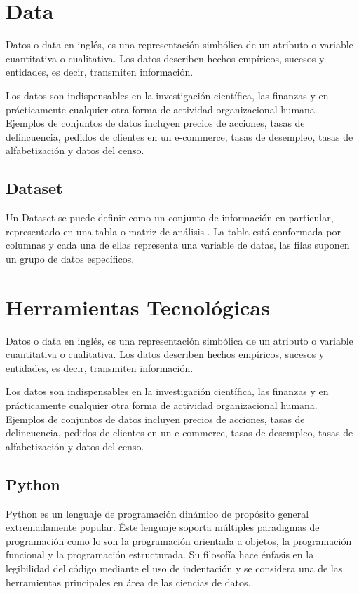 \section{Data}

Datos o data en inglés, es una representación simbólica de un atributo o variable cuantitativa o cualitativa. Los datos describen hechos empíricos, sucesos y entidades, es decir, transmiten información. 

Los datos son indispensables en la investigación científica, las finanzas y en prácticamente cualquier otra forma de actividad organizacional humana. Ejemplos de conjuntos de datos incluyen precios de acciones, tasas de delincuencia, pedidos de clientes en un e-commerce, tasas de desempleo, tasas de alfabetización y datos del censo.
	
\subsection{Dataset}

Un Dataset se puede definir como un conjunto de información en particular, representado en una tabla o matriz de análisis \cite{gold2020}. La tabla está conformada por columnas y cada una de ellas representa una variable de datas, las filas suponen un grupo de datos específicos.

\section{Herramientas Tecnológicas}

Datos o data en inglés, es una representación simbólica de un atributo o variable cuantitativa o cualitativa. Los datos describen hechos empíricos, sucesos y entidades, es decir, transmiten información. 

Los datos son indispensables en la investigación científica, las finanzas y en prácticamente cualquier otra forma de actividad organizacional humana. Ejemplos de conjuntos de datos incluyen precios de acciones, tasas de delincuencia, pedidos de clientes en un e-commerce, tasas de desempleo, tasas de alfabetización y datos del censo.
	
\subsection{Python}

Python es un lenguaje de programación dinámico de propósito general extremadamente popular. Éste lenguaje soporta múltiples paradigmas de programación como lo son la programación orientada a objetos, la programación funcional y la programación estructurada. Su filosofía hace énfasis en la legibilidad del código mediante el uso de indentación y se considera una de las herramientas principales en área de las ciencias de datos.
	
